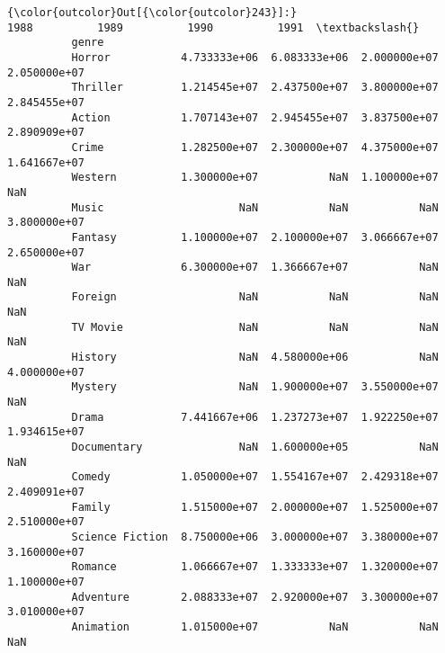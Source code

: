 \documentclass[11pt]{article}
\begin{document}
\begin{Verbatim}[commandchars=\\\{\}]
{\color{outcolor}Out[{\color{outcolor}243}]:}                          1988          1989          1990          1991  \textbackslash{}
          genre                                                                     
          Horror           4.733333e+06  6.083333e+06  2.000000e+07  2.050000e+07   
          Thriller         1.214545e+07  2.437500e+07  3.800000e+07  2.845455e+07   
          Action           1.707143e+07  2.945455e+07  3.837500e+07  2.890909e+07   
          Crime            1.282500e+07  2.300000e+07  4.375000e+07  1.641667e+07   
          Western          1.300000e+07           NaN  1.100000e+07           NaN   
          Music                     NaN           NaN           NaN  3.800000e+07   
          Fantasy          1.100000e+07  2.100000e+07  3.066667e+07  2.650000e+07   
          War              6.300000e+07  1.366667e+07           NaN           NaN   
          Foreign                   NaN           NaN           NaN           NaN   
          TV Movie                  NaN           NaN           NaN           NaN   
          History                   NaN  4.580000e+06           NaN  4.000000e+07   
          Mystery                   NaN  1.900000e+07  3.550000e+07           NaN   
          Drama            7.441667e+06  1.237273e+07  1.922250e+07  1.934615e+07   
          Documentary               NaN  1.600000e+05           NaN           NaN   
          Comedy           1.050000e+07  1.554167e+07  2.429318e+07  2.409091e+07   
          Family           1.515000e+07  2.000000e+07  1.525000e+07  2.510000e+07   
          Science Fiction  8.750000e+06  3.000000e+07  3.380000e+07  3.160000e+07   
          Romance          1.066667e+07  1.333333e+07  1.320000e+07  1.100000e+07   
          Adventure        2.088333e+07  2.920000e+07  3.300000e+07  3.010000e+07   
          Animation        1.015000e+07           NaN           NaN           NaN   
          

\end{Verbatim}
\end{document}
